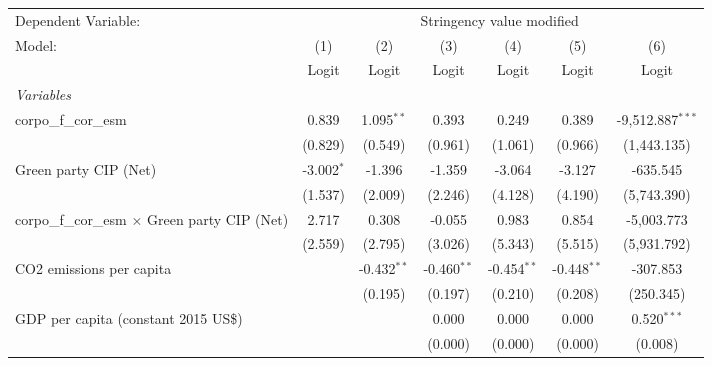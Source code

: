 
\begingroup
\centering
\begin{tabular}{lcccccc}
   \toprule
   Dependent Variable: & \multicolumn{6}{c}{Stringency value modified}\\
   Model:                                                & (1)          & (2)           & (3)           & (4)           & (5)           & (6)\\  
                                                         &  Logit       & Logit         & Logit         & Logit         & Logit         & Logit\\  
   \midrule
   \emph{Variables}\\
   corpo\_f\_cor\_esm                                    & 0.839        & 1.095$^{**}$  & 0.393         & 0.249         & 0.389         & -9,512.887$^{***}$\\   
                                                         & (0.829)      & (0.549)       & (0.961)       & (1.061)       & (0.966)       & (1,443.135)\\   
   Green party CIP (Net)                                 & -3.002$^{*}$ & -1.396        & -1.359        & -3.064        & -3.127        & -635.545\\   
                                                         & (1.537)      & (2.009)       & (2.246)       & (4.128)       & (4.190)       & (5,743.390)\\   
   corpo\_f\_cor\_esm $\times$ Green party CIP (Net)     & 2.717        & 0.308         & -0.055        & 0.983         & 0.854         & -5,003.773\\   
                                                         & (2.559)      & (2.795)       & (3.026)       & (5.343)       & (5.515)       & (5,931.792)\\   
   CO2 emissions per capita                              &              & -0.432$^{**}$ & -0.460$^{**}$ & -0.454$^{**}$ & -0.448$^{**}$ & -307.853\\   
                                                         &              & (0.195)       & (0.197)       & (0.210)       & (0.208)       & (250.345)\\   
   GDP per capita (constant 2015 US\$)                   &              &               & 0.000         & 0.000         & 0.000         & 0.520$^{***}$\\   
                                                         &              &               & (0.000)       & (0.000)       & (0.000)       & (0.008)\\   

\end{tabular}
